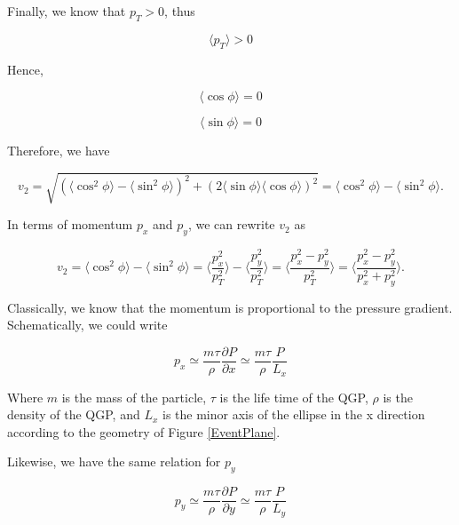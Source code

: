 Finally, we know that $p_T > 0$, thus   
 
\begin{equation}
\langle p_T \rangle > 0
\end{equation}  
 
Hence,  


\begin{equation}
\langle \cos \phi \rangle =  0
\end{equation} 


\begin{equation}
\langle \sin \phi \rangle =  0
\end{equation}

Therefore, we have 

\begin{equation}
v_2 = \sqrt{(\langle \cos^2 \phi \rangle - \langle \sin^2 \phi \rangle)^2 + (2  \langle \sin \phi \rangle \langle \cos \phi \rangle)^2} = \langle \cos^2 \phi \rangle - \langle \sin^2 \phi \rangle. 
\end{equation}

In terms of momentum $p_x$ and $p_y$, we can rewrite $v_2$ as 

\begin{equation}
v_2 =  \langle \cos^2 \phi \rangle - \langle \sin^2 \phi \rangle = \langle\frac{p_x^2}{p_T^2} \rangle - \langle \frac{p_y^2}{p_T^2} \rangle = \langle \frac{p_x^2 - p_y^2}{p_T^2} \rangle = \langle \frac{p_x^2 - p_y^2}{p_x^2 + p_y^2} \rangle. 
\end{equation}

Classically, we know that the momentum is proportional to the pressure gradient. Schematically, we could write

\begin{equation}
p_x \simeq \frac{m\tau}{\rho}\frac{\partial P}{\partial x} \simeq \frac{m\tau}{\rho}\frac{P}{L_x}
\end{equation}

Where $m$ is the mass of the particle, $\tau$ is the life time of the QGP, $\rho$ is the density of the QGP, and $L_x$ is the minor axis of the ellipse in the x direction according to the geometry of Figure \ref{EventPlane}.

Likewise, we have the same relation for $p_y$

\begin{equation}
p_y \simeq \frac{m\tau}{\rho}\frac{\partial P}{\partial y} \simeq \frac{m\tau}{\rho}\frac{ P}{L_y}
\end{equation} 

